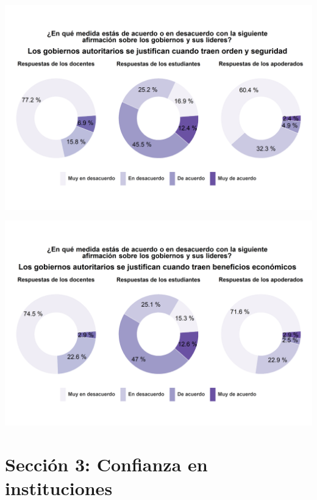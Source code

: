 \documentclass[
  14pt,
]{book}
\begin{document}
\begin{center}\includegraphics[width=52.49in]{images/graph_aut8} \end{center}

\begin{center}\includegraphics[width=52.49in]{images/graph_aut9} \end{center}

\hypertarget{secciuxf3n-3-confianza-en-instituciones}{%
\section{Sección 3: Confianza en instituciones}\label{secciuxf3n-3-confianza-en-instituciones}}
\end{document}
